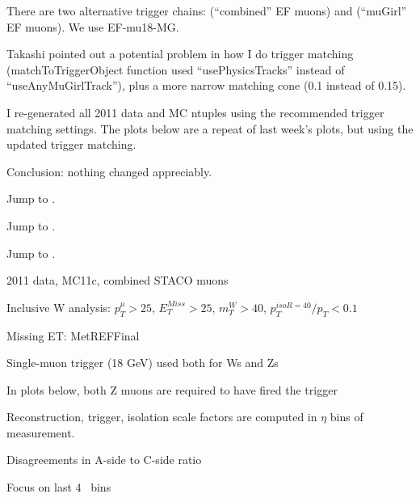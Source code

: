 

{
\iteb
\item There are two alternative trigger chains:  (``combined'' EF muons) and  (``muGirl'' EF muons). We use EF-mu18-MG.
\item Takashi pointed out a potential problem in how I do trigger matching (matchToTriggerObject function used ``usePhysicsTracks'' instead of ``useAnyMuGirlTrack''), plus a more narrow matching cone (0.1 instead of 0.15).
\item I re-generated all 2011 data and MC ntuples using the recommended trigger matching settings. The plots below are a repeat of last week's plots, but using the updated trigger matching.
\item Conclusion: nothing changed appreciably.
\item Jump to \hyperlink{D3PD}{}.
\item Jump to \hyperlink{WTRIG}{}.
\item Jump to \hyperlink{CUTOUT}{}.
\itee
}

{
 \iteb
 \item 2011 data, MC11c, combined STACO muons
 \item Inclusive W analysis: $p_T^{\mu}>25$, $E_T^{Miss}>25$, $m_T^{W}>40$, $p_{T}^{iso R=40}/p_{T}<0.1$
 \item Missing ET: MetREFFinal
 \item Single-muon trigger (18 GeV) used both for Ws and Zs
 \iteb
 \item In plots below, both Z muons are required to have fired the trigger
 \itee
 \item Reconstruction, trigger, isolation scale factors are computed in $\eta$ bins of measurement.
 \item Disagreements in A-side to C-side ratio
 \item Focus on last 4 \eta\ bins
 \itee
}


